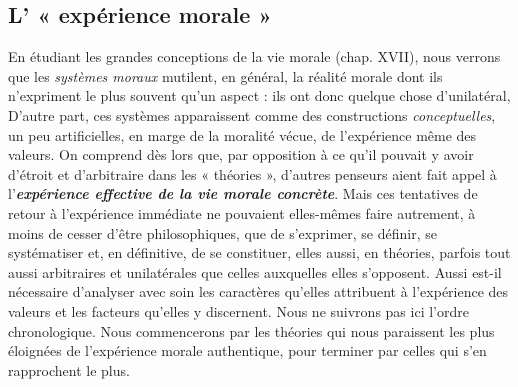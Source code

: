 \subsection{L’ « expérience morale »}%
En étudiant les grandes conceptions
de la vie morale (chap. XVII), nous verrons que les {\it systèmes
moraux} mutilent, en général, la réalité morale dont ils n’expriment
le plus souvent qu’un aspect : ils ont donc quelque chose d’unilatéral,
D'autre part, ces systèmes apparaissent comme des constructions
{\it conceptuelles}, un peu artificielles, en marge de la moralité vécue, de
l'expérience même des valeurs. On comprend dès lors que, par opposition
à ce qu’il pouvait y avoir d'étroit et d’arbitraire dans les
« théories », d’autres penseurs aient fait appel à
l’\textbf{\textit {expérience effective de la vie morale concrète}}.
Mais ces tentatives de retour à l'expérience
immédiate ne pouvaient elles-mêmes faire autrement, à moins de
cesser d’être philosophiques, que de s’exprimer, se définir, se systématiser
et, en définitive, de se constituer, elles aussi, en théories,
parfois tout aussi arbitraires et unilatérales que celles auxquelles
elles s’opposent. Aussi est-il nécessaire d’analyser avec soin les caractères
qu’elles attribuent à l’expérience des valeurs et les facteurs
qu’elles y discernent. Nous ne suivrons pas ici l’ordre chronologique.
Nous commencerons par les théories qui nous paraissent les plus
éloignées de l'expérience morale authentique, pour terminer par
celles qui s’en rapprochent le plus.

